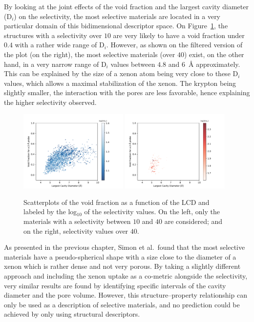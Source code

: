 \documentclass[main.tex]{subfiles}
\begin{document}
By looking at the joint effects of the void fraction and the largest cavity diameter (D$_i$) on the selectivity, the most selective materials are located in a very particular domain of this bidimensional descriptor space. On Figure~\ref{fgr:lcd_vf}, the structures with a selectivity over $10$ are very likely to have a void fraction under $0.4$ with a rather wide range of D$_i$. However, as shown on the filtered version of the plot (on the right), the most selective materials (over $40$) exist, on the other hand, in a very narrow range of D$_i$ values between $4.8$ and $6$~\si{\angstrom} approximately. This can be explained by the size of a xenon atom being very close to these D$_i$ values, which allows a maximal stabilization of the xenon. The krypton being slightly smaller, the interaction with the pores are less favorable, hence explaining the higher selectivity observed. 

\begin{figure}[ht!]
  \centering
  \includegraphics[width=0.48\textwidth]{figures/2-thermo/Scatterplot_vf_lcd_selectivity.pdf}
  \includegraphics[width=0.48\textwidth]{figures/2-thermo/Scatterplot_vf_lcd_selectivity_zoom.pdf}  
  \caption{Scatterplots of the void fraction as a function of the LCD and labeled by the log$_{10}$ of the selectivity values. On the left, only the materials with a selectivity between $10$ and $40$ are considered; and on the right, selectivity values over $40$.}\label{fgr:lcd_vf}
\end{figure}


As presented in the previous chapter, Simon et al.\ found that the most selective materials have a pseudo-spherical shape with a size close to the diameter of a xenon which is rather dense and not very porous. By taking a slightly different approach and including the xenon uptake as a co-metric alongside the selectivity, very similar results are found by identifying specific intervals of the cavity diameter and the pore volume. However, this structure--property relationship can only be used as a description of selective materials, and no prediction could be achieved by only using structural descriptors. 
\end{document}
